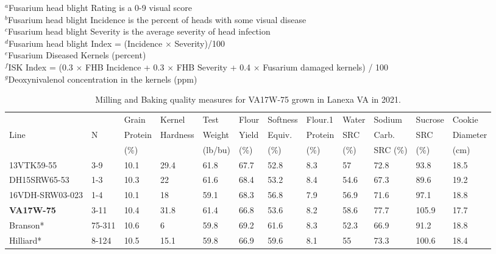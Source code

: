 \documentclass[12pt, letterpaper]{article}
\begin{document}
\begin{landscape}
\begin{table}
\raggedright{
\footnotesize
$^a$Fusarium head blight Rating is a 0-9 visual score  \\
$^b$Fusarium head blight Incidence is the percent of heads with some visual disease \\
$^c$Fusarium head blight Severity is the average severity of head infection  \\
$^d$Fusarium head blight Index = (Incidence $\times$ Severity)/100 \\
$^e$Fusarium Diseased Kernels (percent) \\
$^f$ISK Index = (0.3 $\times$ FHB Incidence + 0.3 $\times$ FHB Severity + 0.4 $\times$ Fusarium damaged kernels) / 100\\
$^g$Deoxynivalenol concentration in the kernels (ppm)\\
}
\end{table}

\newpage

\begin{table}
\caption{Milling and Baking quality measures for VA17W-75 grown in Lanexa VA in 2021.}
\label{qual}
\begin{tabular}{llllllllllll}
  \hline
 &  & Grain & Kernel & Test & Flour & Softness & Flour.1 & Water & Sodium & Sucrose & Cookie \\ 
Line & N & Protein  & Hardness & Weight & Yield & Equiv. & Protein & SRC & Carb. & SRC & Diameter \\ 
   &  & (\%) &  & (lb/bu) & (\%) & (\%) & (\%) & (\%) & SRC (\%) & (\%) & (cm) \\ 
  \hline
  13VTK59-55 & 3-9 & 10.1 & 29.4 & 61.8 & 67.7 & 52.8 & 8.3 & 57 & 72.8 & 93.8 & 18.5 \\ 
  DH15SRW65-53 & 1-3 & 10.3 & 22 & 61.6 & 68.4 & 53.2 & 8.4 & 54.6 & 67.3 & 89.6 & 19.2 \\ 
  16VDH-SRW03-023 & 1-4 & 10.1 & 18 & 59.1 & 68.3 & 56.8 & 7.9 & 56.9 & 71.6 & 97.1 & 18.8 \\ 
  \textbf{VA17W-75} & 3-11 & 10.4 & 31.8 & 61.4 & 66.8 & 53.6 & 8.2 & 58.6 & 77.7 & 105.9 & 17.7 \\ 
  Branson* & 75-311 & 10.6 & 6 & 59.8 & 69.2 & 61.6 & 8.3 & 52.3 & 66.9 & 91.2 & 18.8 \\ 
  Hilliard* & 8-124  & 10.5 & 15.1 & 59.8 & 66.9 & 59.6 & 8.1 & 55 & 73.3 & 100.6 & 18.4 \\ 
   \hline
\end{tabular}
\end{table}

\newpage



\end{landscape}
\end{document}
